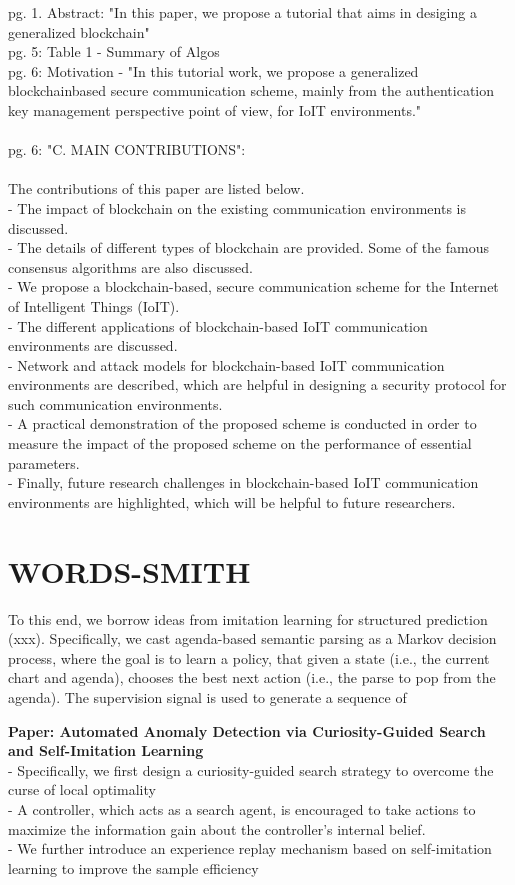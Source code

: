 \documentclass{article}
\begin{document}
	
	pg. 1. Abstract: "In this paper, we propose a tutorial that aims in desiging a generalized blockchain"\\
	pg. 5: Table 1 - Summary of Algos\\
	pg. 6: Motivation - "In this tutorial work, we propose a generalized blockchainbased secure communication scheme, mainly from the authentication key management perspective point of view, for IoIT environments."\\\\
	pg. 6: "C. MAIN CONTRIBUTIONS":\\\\
	The contributions of this paper are listed below.\\
	- The impact of blockchain on the existing communication environments is discussed.\\
	- The details of different types of blockchain are provided. Some of the famous consensus algorithms are also discussed.\\
	- We propose a blockchain-based, secure communication scheme for the Internet of Intelligent Things (IoIT).\\
	- The different applications of blockchain-based IoIT communication environments are discussed.\\
	- Network and attack models for blockchain-based IoIT communication environments are described, which are helpful in designing a security protocol for such communication environments.\\
	- A practical demonstration of the proposed scheme is conducted in order to measure the impact of the proposed scheme on the performance of essential parameters.\\
	- Finally, future research challenges in blockchain-based IoIT communication environments are highlighted, which will be helpful to future researchers.\\
	
	\section{WORDS-SMITH}
	To this end, we borrow ideas from imitation learning for structured prediction (xxx). Specifically, we cast agenda-based semantic parsing as a Markov decision process, where the goal is to learn a policy, that given a state (i.e., the current chart and agenda), chooses the best next action (i.e., the parse to pop from the agenda). The supervision signal is used to generate a sequence of
	
	
	\textbf{Paper: Automated Anomaly Detection via Curiosity-Guided Search and Self-Imitation Learning}\\
	- Specifically, we first design a curiosity-guided search strategy to overcome the curse of local optimality\\
	- A controller, which acts as a search agent, is encouraged to take actions to maximize the information gain about the controller's internal belief.\\
	- We further introduce an experience replay mechanism based on self-imitation learning to improve the sample efficiency\\
	
\end{document}
